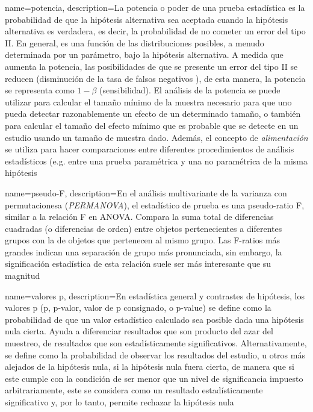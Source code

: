   {name=potencia,
   description={La potencia o poder de una prueba estadística es la probabilidad de que la hipótesis alternativa sea aceptada cuando la hipótesis alternativa es verdadera, es decir, la probabilidad de no cometer un error del tipo II. En general, es una función de las distribuciones posibles, a menudo determinada por un parámetro, bajo la hipótesis alternativa. A medida que aumenta la potencia, las posibilidades de que se presente un error del tipo II se reducen (disminución de la tasa de falsos negativos \beta), de esta manera, la potencia se representa como $1-\beta$ (sensibilidad). El análisis de la potencia se puede utilizar para calcular el tamaño mínimo de la muestra necesario para que uno pueda detectar razonablemente un efecto de un determinado tamaño, o también para calcular el tamaño del efecto mínimo que es probable que se detecte en un estudio usando un tamaño de muestra dado. Además, el concepto de \textit{alimentación} se utiliza para hacer comparaciones entre diferentes procedimientos de análisis estadísticos (e.g. entre una prueba paramétrica y una no paramétrica de la misma hipótesis}
  }

  {name=pseudo-F,
   description={En el análisis multivariante de la varianza con permutacionesa (\textit{PERMANOVA}), el estadístico de prueba es una pseudo-ratio F, similar a la relación F en ANOVA. Compara la suma total de diferencias cuadradas (o diferencias de orden) entre objetos pertenecientes a diferentes grupos con la de objetos que pertenecen al mismo grupo. Las F-ratios más grandes indican una separación de grupo más pronunciada, sin embargo, la significación estadística de esta relación suele ser más interesante que su magnitud}
  }

  {name=valores p,
   description={En estadística general y contrastes de hipótesis, los valores p (p, p-valor, valor de p consignado, o p-value) se define como la probabilidad de que un valor estadístico calculado sea posible dada una hipótesis nula cierta. Ayuda a diferenciar resultados que son producto del azar del muestreo, de resultados que son estadísticamente significativos. Alternativamente, se define como la probabilidad de observar los resultados del estudio, u otros más alejados de la hipótesis nula, si la hipótesis nula fuera cierta, de manera que si este cumple con la condición de ser menor que un nivel de significancia impuesto arbitrariamente, este se considera como un resultado estadísticamente significativo y, por lo tanto, permite rechazar la hipótesis nula}
  }


